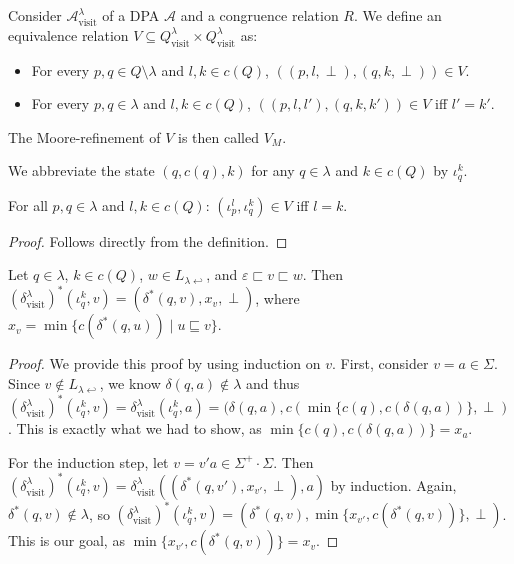 \begin{defn}
	Consider $\mathcal{A}^\lambda_\text{visit}$ of a DPA $\mathcal{A}$ and a congruence relation $R$. We define an equivalence relation $V \subseteq Q^\lambda_\text{visit} \times Q^\lambda_\text{visit}$ as:
	\begin{itemize}
		\item For every $p, q \in Q \setminus \lambda$ and $l, k \in c(Q)$, $((p, l, \perp), (q, k, \perp)) \in V$.
		\item For every $p, q \in \lambda$ and $l, k \in c(Q)$, $((p, l, l'), (q, k, k')) \in V$ iff $l' = k'$.
	\end{itemize}
	
	The Moore-refinement of $V$ is then called $V_M$.
	
	We abbreviate the state $(q, c(q), k)$ for any $q \in \lambda$ and $k \in c(Q)$ by $\iota_q^k$.
\end{defn}

\begin{lem}
	For all $p, q \in \lambda$ and $l, k \in c(Q)$: $(\iota_p^l, \iota_q^k) \in V$ iff $l = k$.
	\label{lem:pr_alg2:iota_equiv}
\end{lem}

\begin{proof}
	Follows directly from the definition.
\end{proof}


\begin{lem}
	Let $q \in \lambda$, $k \in c(Q)$, $w \in L_{\lambda \hookleftarrow}$, and $\varepsilon \sqsubset v \sqsubset w$. Then $(\delta^\lambda_\text{visit})^*(\iota_q^k, v) = (\delta^*(q, v), x_v, \perp)$, where $x_v = \min \{c(\delta^*(q, u)) \mid u \sqsubseteq v\}$.
	\label{lem:pr_alg2:delta_charact_1}
\end{lem}

\begin{proof}
	We provide this proof by using induction on $v$. First, consider $v = a \in \Sigma$. Since $v \notin L_{\lambda \hookleftarrow}$, we know $\delta(q, a) \notin \lambda$ and thus $(\delta^\lambda_\text{visit})^*(\iota_q^k, v) = \delta^\lambda_\text{visit}(\iota_q^k, a) = (\delta(q, a), c(\min \{c(q), c(\delta(q, a))\}, \perp)$. This is exactly what we had to show, as $\min \{c(q), c(\delta(q, a))\} = x_a$.
	
	For the induction step, let $v = v'a \in \Sigma^+ \cdot \Sigma$. Then $(\delta^\lambda_\text{visit})^*(\iota_q^k, v) = \delta^\lambda_\text{visit}((\delta^*(q, v'), x_{v'}, \perp), a)$ by induction. Again, $\delta^*(q, v) \notin \lambda$, so $(\delta^\lambda_\text{visit})^*(\iota_q^k, v) = (\delta^*(q, v), \min \{x_{v'}, c(\delta^*(q, v))\}, \perp)$. This is our goal, as $\min \{x_{v'}, c(\delta^*(q, v))\} = x_v$.
\end{proof}


